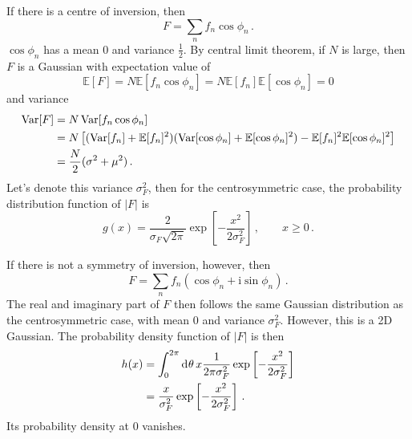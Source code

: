 \documentclass{article}
\theoremstyle{plain}\theoremheaderfont{\normalfont\itshape}\theorembodyfont{\rmfamily}\theoremseparator{.}\newtheorem*{rem}{Remark}\newtheorem*{ex}{Example}\newtheorem*{proof}{Proof}\newtheorem*{altp}{Alternative proof}
\theoremstyle{plain}\theoremheaderfont{\normalfont\bfseries}\theorembodyfont{\rmfamily}\theoremseparator{.}\newtheorem{thm}{Theorem}[section]\newtheorem{lem}[thm]{Lemma}\newtheorem{prop}[thm]{Proposition}\newtheorem*{cor}{Corollary}\newtheorem{defn}[thm]{Definition}\newtheorem{clm}[thm]{Claim}\newtheorem{clminproof}{Claim}\newtheorem*{law}{Law}\newtheorem{pos}[thm]{Postulate}
\theoremstyle{break}\theoremheaderfont{\normalfont\itshape}\theorembodyfont{\rmfamily}\theoremseparator{.\medskip}\newtheorem*{proofskip}{Proof}\newtheorem*{exs}{Examples}\newtheorem*{rems}{Remarks}
\theoremstyle{break}\theoremheaderfont{\normalfont\bfseries}\theorembodyfont{\rmfamily}\theoremseparator{.\medskip}\newtheorem{lemskip}[thm]{Lemma}\newtheorem{defnskip}[thm]{Definition}\newtheorem{propskip}[thm]{Proposition}\newtheorem{thmskip}[thm]{Theorem}
\numberwithin{equation}{section}
\newcommand{\ii}{\mathrm{i}}
\newcommand{\dd}[2][]{\mathrm{d}^{#1} #2\,}
\newcommand{\abs}[1]{\left| #1 \right|}
\DeclareMathOperator{\Var}{Var}
\begin{document}
    If there is a centre of inversion, then
    \begin{equation}
        F=\sum_n f_n\cos\phi_n\,.
    \end{equation}
    \(\cos\phi_n\) has a mean \(0\) and variance \(\frac{1}{2}\). By central limit theorem, if \(N\) is large, then \(F\) is a Gaussian with expectation value of
    \begin{equation}
        \mathbb{E}[F]=N \mathbb{E}[f_n\cos\phi_n]=N\mathbb{E}[f_n]\mathbb{E}[\cos\phi_n]=0
    \end{equation}
    and variance
    \begin{align}
        \Var[F]&=N\Var[f_n\cos\phi_n]\notag \\
        &=N\left[(\Var[f_n]+\mathbb{E}[f_n]^2)(\Var[\cos\phi_n]+\mathbb{E}[\cos\phi_n]^2)-\mathbb{E}[f_n]^2\mathbb{E}[\cos\phi_n]^2\right]\notag\\
        &=\frac{N}{2}(\sigma^2+\mu^2)\,.
    \end{align}
    Let's denote this variance \(\sigma_F^2\), then for the centrosymmetric case, the probability distribution function of \(\abs{F}\) is
    \begin{equation}
        g(x)=\frac{2}{\sigma_F\sqrt{2\pi}}\exp\left[-\frac{x^2}{2\sigma_F^2}\right]\,, \qquad x\ge 0\,.
    \end{equation}

    If there is not a symmetry of inversion, however, then
    \begin{equation}
        F=\sum_n f_n(\cos\phi_n+\ii\sin\phi_n)\,.
    \end{equation}
    The real and imaginary part of \(F\) then follows the same Gaussian distribution as the centrosymmetric case, with mean \(0\) and variance \(\sigma_F^2\). However, this is a 2D Gaussian. The probability density function of \(\abs{F}\) is then
    \begin{align}
        h(x)&=\int_{0}^{2\pi}\dd{\theta}x\frac{1}{2\pi \sigma_F^2}\exp\left[-\frac{x^2}{2\sigma_F^2}\right]\notag\\
        &=\frac{x}{\sigma_F^2}\exp\left[-\frac{x^2}{2\sigma_F^2}\right]\,.
    \end{align}
    Its probability density at 0 vanishes.

    \begin{figure}[ht!]
        \centering
    \end{figure}
\end{document}
